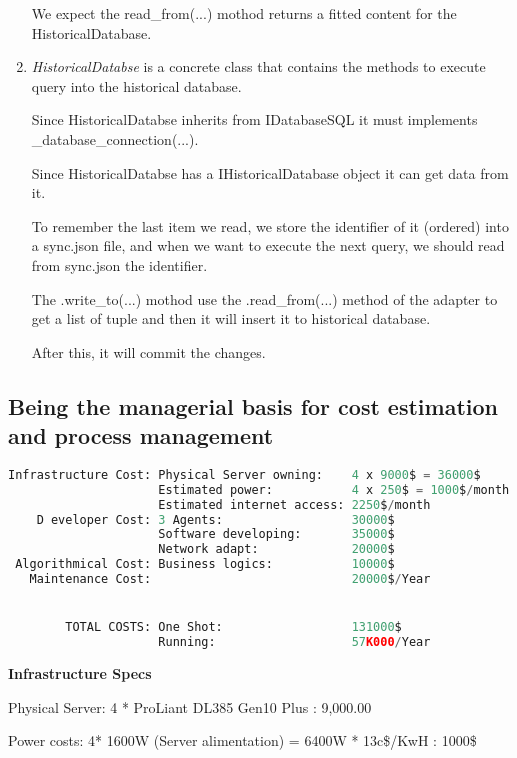 \begin{enumerate}
     We expect the read\_from(...) mothod returns a fitted content for the HistoricalDatabase. 

	\item \textit{HistoricalDatabse} is a concrete class that contains the methods to execute query into the historical database.
	
     Since HistoricalDatabse inherits from IDatabaseSQL it must implements \_database\_connection(...).
    
     Since HistoricalDatabse has a IHistoricalDatabase object it can get data from it.
     
     To remember the last item we read, we store the identifier of it (ordered) into a sync.json file, and when we want to execute the next query, we should read from sync.json the identifier.
        
     The .write\_to(...) mothod use the .read\_from(...) method of the adapter to get a list of tuple and then it will insert it to historical database. 
     
     After this, it will commit the changes.
\end{enumerate}

\subsection{Being the managerial basis for cost estimation and process management}

\begin{lstlisting}[language=Python, numbers=none]
Infrastructure Cost: Physical Server owning:    4 x 9000$ = 36000$
                     Estimated power:           4 x 250$ = 1000$/month
                     Estimated internet access: 2250$/month
    D eveloper Cost: 3 Agents:                  30000$
                     Software developing:       35000$
                     Network adapt:             20000$
 Algorithmical Cost: Business logics:           10000$
   Maintenance Cost:                            20000$/Year


        TOTAL COSTS: One Shot:                  131000$
                     Running:                   57K000/Year 
\end{lstlisting}

\textbf{Infrastructure Specs}

Physical Server: 4 * ProLiant DL385 Gen10 Plus : 9,000.00 

Power costs:     4* 1600W (Server alimentation) = 6400W * 13c\$/KwH : 1000\$

